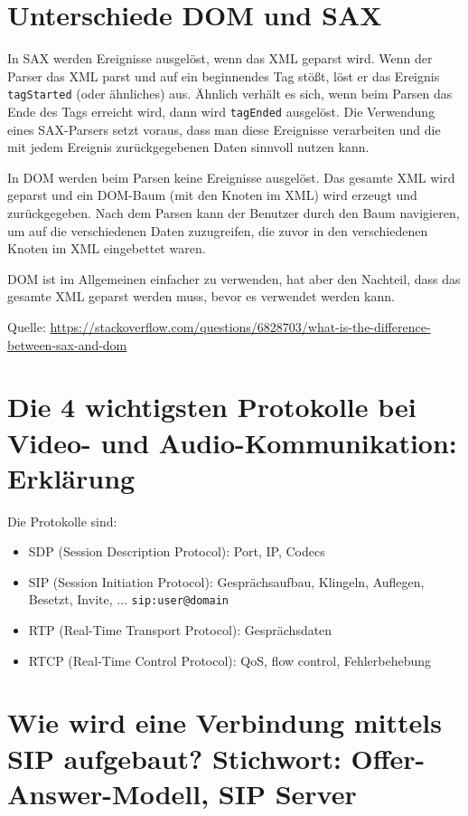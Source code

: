 \documentclass{article}
\begin{document}
	\section*{Unterschiede DOM und SAX}
	
	In SAX werden Ereignisse ausgelöst, wenn das XML geparst wird. Wenn der Parser das XML parst und auf ein beginnendes Tag stößt, löst er das Ereignis \texttt{tagStarted} (oder ähnliches) aus. Ähnlich verhält es sich, wenn beim Parsen das Ende des Tags erreicht wird, dann wird \texttt{tagEnded} ausgelöst. Die Verwendung eines SAX-Parsers setzt voraus, dass man diese Ereignisse verarbeiten und die mit jedem Ereignis zurückgegebenen Daten sinnvoll nutzen kann.
	
	In DOM werden beim Parsen keine Ereignisse ausgelöst. Das gesamte XML wird geparst und ein DOM-Baum (mit den Knoten im XML) wird erzeugt und zurückgegeben. Nach dem Parsen kann der Benutzer durch den Baum navigieren, um auf die verschiedenen Daten zuzugreifen, die zuvor in den verschiedenen Knoten im XML eingebettet waren.
	
	DOM ist im Allgemeinen einfacher zu verwenden, hat aber den Nachteil, dass das gesamte XML geparst werden muss, bevor es verwendet werden kann.
	
	Quelle: \url{https://stackoverflow.com/questions/6828703/what-is-the-difference-between-sax-and-dom}
	
	\section*{Die 4 wichtigsten Protokolle bei Video- und Audio-Kommunikation: Erklärung}
	
	Die Protokolle sind:
	\begin{itemize}
		\item SDP (Session Description Protocol): Port, IP, Codecs
		\item SIP (Session Initiation Protocol): Gesprächsaufbau, Klingeln, Auflegen, Besetzt, Invite, ... \texttt{sip:user@domain}
		\item RTP (Real-Time Transport Protocol): Gesprächsdaten
		\item RTCP (Real-Time Control Protocol): QoS, flow control, Fehlerbehebung
	\end{itemize}
	
	\section*{Wie wird eine Verbindung mittels SIP aufgebaut? Stichwort: Offer-Answer-Modell, SIP Server}
	
\end{document}
